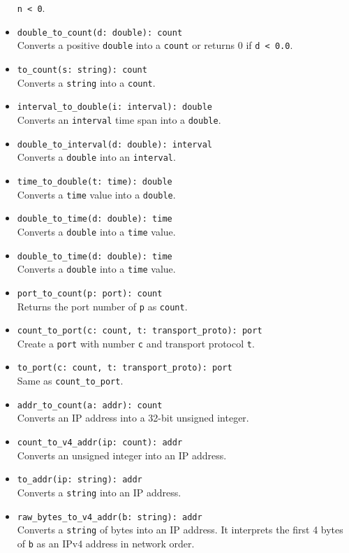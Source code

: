 \documentclass[10pt,landscape]{article}
\begin{document}
\begin{multicols*}{2}
\begin{itemize}
    \texttt{n < 0}.
  \item \verb|double_to_count(d: double): count|\\
    Converts a positive \texttt{double} into a \texttt{count} or returns 0 if
    \texttt{d < 0.0}.
  \item \verb|to_count(s: string): count|\\
    Converts a \texttt{string} into a \texttt{count}.
  \item \verb|interval_to_double(i: interval): double|\\
    Converts an \texttt{interval} time span into a \texttt{double}.
  \item \verb|double_to_interval(d: double): interval|\\
    Converts a \texttt{double} into an \texttt{interval}.
  \item \verb|time_to_double(t: time): double|\\
    Converts a \texttt{time} value into a \texttt{double}.
  \item \verb|double_to_time(d: double): time|\\
    Converts a \texttt{double} into a \texttt{time} value.
  \item \verb|double_to_time(d: double): time|\\
    Converts a \texttt{double} into a \texttt{time} value.
  \item \verb|port_to_count(p: port): count|\\
    Returns the port number of \texttt{p} as \texttt{count}.
  \item \verb|count_to_port(c: count, t: transport_proto): port|\\
    Create a \texttt{port} with number \texttt{c} and transport protocol
    \texttt{t}.
  \item \verb|to_port(c: count, t: transport_proto): port|\\
    Same as \verb|count_to_port|.
  \item \verb|addr_to_count(a: addr): count|\\
    Converts an IP address into a 32-bit unsigned integer.
  \item \verb|count_to_v4_addr(ip: count): addr|\\
    Converts an unsigned integer into an IP address.
  \item \verb|to_addr(ip: string): addr|\\
    Converts a \texttt{string} into an IP address.
  \item \verb|raw_bytes_to_v4_addr(b: string): addr|\\
    Converts a \texttt{string} of bytes into an IP address. It interprets the
    first 4 bytes of \texttt{b} as an IPv4 address in network order.
\end{itemize}


\end{multicols*}
\end{document}
